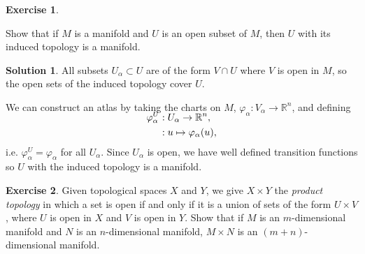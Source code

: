 \documentclass[11pt, a4paper]{report}
\theoremstyle{definition}
\newtheorem{ex}{Exercise}[part]
\newtheorem{sol}{Solution}[part]
\begin{document}
\begin{ex}\label{ex:opensubsetismanifold}

Show that if $M$ is a manifold and $U$ is an open subset of $M$, then $U$ with its induced topology is a manifold.

\end{ex}

\begin{sol}

All subsets $U_\alpha \subset U$ are of the form $V \cap U$ where $V$ is open in $M$, so the open sets of the induced topology cover $U$.

We can construct an atlas by taking the charts on $M$, $\varphi_\alpha: V_\alpha \to \mathbb{R}^n$, and defining
\begin{align*}
    \SwapAboveDisplaySkip
    \varphi^U_\alpha&: U_\alpha \to \mathbb{R}^n, \\
                    &: u \mapsto \varphi_\alpha(u),
\end{align*}
i.e. $\varphi^U_\alpha = \varphi_\alpha$ for all $U_\alpha$.
Since $U_\alpha$ is open, we have well defined transition functions so $U$ with the induced topology is a manifold.

\end{sol}

\begin{ex}

Given topological spaces $X$ and $Y$, we give $X \times Y$ the \emph{product topology} in which a set is open if and only if it is a union of sets of the form $U \times V$, where $U$ is open in $X$ and $V$ is open in $Y$. Show that if $M$ is an $m$-dimensional manifold and $N$ is an $n$-dimensional manifold, $M \times N$ is an $(m + n)$-dimensional manifold.

\end{ex}
\end{document}
